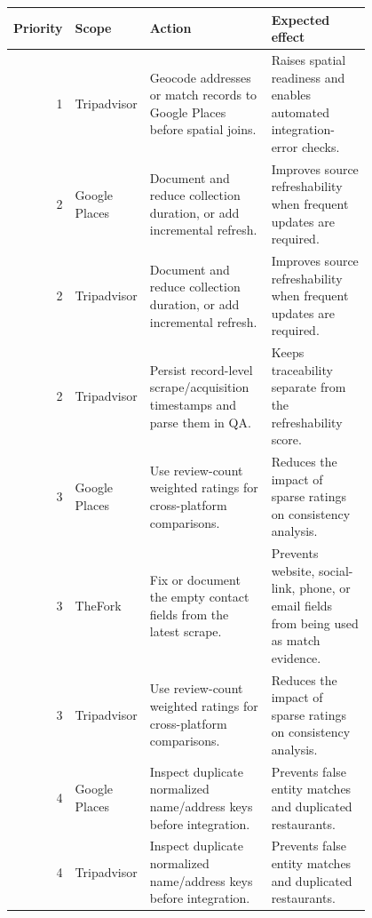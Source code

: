 {\scriptsize
\begin{tabular}{rp{0.18\linewidth}p{0.34\linewidth}p{0.28\linewidth}}
\toprule
Priority & Scope & Action & Expected effect \\
\midrule
1 & Tripadvisor & Geocode addresses or match records to Google Places before spatial joins. & Raises spatial readiness and enables automated integration-error checks. \\
2 & Google Places & Document and reduce collection duration, or add incremental refresh. & Improves source refreshability when frequent updates are required. \\
2 & Tripadvisor & Document and reduce collection duration, or add incremental refresh. & Improves source refreshability when frequent updates are required. \\
2 & Tripadvisor & Persist record-level scrape/acquisition timestamps and parse them in QA. & Keeps traceability separate from the refreshability score. \\
3 & Google Places & Use review-count weighted ratings for cross-platform comparisons. & Reduces the impact of sparse ratings on consistency analysis. \\
3 & TheFork & Fix or document the empty contact fields from the latest scrape. & Prevents website, social-link, phone, or email fields from being used as match evidence. \\
3 & Tripadvisor & Use review-count weighted ratings for cross-platform comparisons. & Reduces the impact of sparse ratings on consistency analysis. \\
4 & Google Places & Inspect duplicate normalized name/address keys before integration. & Prevents false entity matches and duplicated restaurants. \\
4 & Tripadvisor & Inspect duplicate normalized name/address keys before integration. & Prevents false entity matches and duplicated restaurants. \\
\bottomrule
\end{tabular}
}
